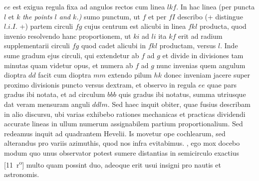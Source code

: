\pstart $ee$ est exigua regula fixa ad angulos rectos cum linea $lkf$. In hac linea (per puncta $l$ et $k$  \textit{the points $l$ and $k$.)} sumo punctum, ut $f$ et per $fI$ describo (+ distingue $l.i.I.$ +) partem circuli $fg$ cujus centrum est alicubi in linea $fkl$ producta, quod invenio resolvendo hanc proportionem, ut $ki$ ad $li$ ita $kf$ erit ad radium supplementarii circuli $fg$ quod cadet alicubi in $fkl$ productam, versus $l$. Inde sume gradum ejus circuli, qui extendetur ab $f$ ad $g$ et divide in divisiones tam minutas quam videtur opus, et numera ab $f$ ad $g$ nunc invenias quem angulum dioptra\protect{} $dd$ facit cum dioptra\protect{} $mm$ extendo pilum $hk$ donec inveniam jacere super proximo divisionis puncto versus dextram, et observo in regula $ee$ quae pars gradus ibi notata, et ad circulum $bbb$ quis gradus ibi notatus, summa utriusque dat veram mensuram anguli $ddlm$. Sed haec inquit obiter, quae fusius describam in alio discursu, ubi varias exhibebo rationes mechanicas et practicas dividendi accurate lineas in ullum numerum assignabilem partium proportionalium. Sed redeamus inquit ad quadrantem\protect{} Hevelii\protect{}. Is movetur ope cochlearum, sed alterandus pro variis azimuthis\protect{}, quod nos infra evitabimus. , ego mox docebo modum quo unus observator potest sumere distantias in semicirculo exactius [11~r\textsuperscript{o}] multo quam possint duo, adeoque erit usui insigni pro nautis et astronomis. 
\pend 